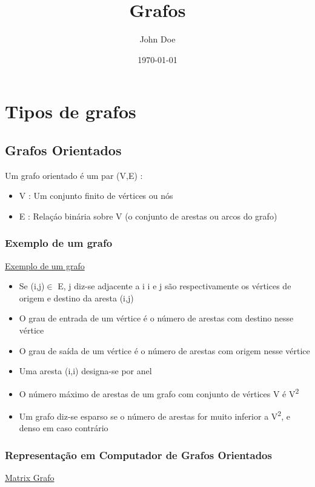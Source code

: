 \documentclass[11pt]{article}
\author{John Doe}
\date{\today}
\title{Grafos}
\begin{document}
\maketitle
\tableofcontents

\section{Tipos de grafos}
\label{sec:orgc538a24}
\subsection{Grafos Orientados}
\label{sec:orgd48741e}
Um grafo orientado é um par (V,E) :
\begin{itemize}
\item V : Um conjunto finito de vértices ou nós
\item E : Relaçáo binária sobre V (o conjunto de arestas ou arcos do grafo)
\end{itemize}

\subsubsection{Exemplo de um grafo}
\label{sec:org1cab64e}
\href{./exemplo\_grafo.png}{Exemplo de um grafo
}
\begin{itemize}
\item Se (i,j)\(\in\) E, j diz-se adjacente a i
i e j são respectivamente os vértices de origem e destino da aresta (i,j)

\item O grau de entrada de um vértice  é o número de arestas com destino nesse vértice
\item O grau de saída de um vértice  é o número de arestas com origem nesse vértice
\item Uma aresta (i,i) designa-se por anel
\item O número máximo de arestas de um grafo com conjunto de vértices V é V\textsuperscript{2}
\item Um grafo diz-se esparso se o número de arestas for muito inferior a V\textsuperscript{2}, e denso em caso contrário
\end{itemize}

\subsubsection{Representação em Computador de Grafos Orientados}
\label{sec:org40a9853}
\href{./matrix\_grafo.png}{Matrix Grafo}
\end{document}
